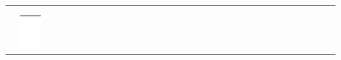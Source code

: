 \documentclass[10pt]{article}
\begin{document}
\begin{center}
\begin{tabular}{|c|c|c|c|c|c|c|c|c|c|c|c|c|c|c|c|c|c|c|c|c|c|c|c|c|c|c|c|c|c|c|c|}
\hline
 &  &  &  &  &  &  &  &  &  &  &  &  &  &  &  &  &  &  &  &  &  &  &  &  &  &  &  &  &  &  &  \\
\hline
 &  &  &  &  &  &  &  &  &  &  &  &  &  &  &  &  &  &  &  &  &  &  &  &  &  &  &  &  &  &  &  \\
\hline
 &  &  &  &  &  &  &  &  &  &  &  &  &  &  &  &  &  &  &  &  &  &  &  &  &  &  &  &  &  &  &  \\
\hline
 & \includegraphics[max width=\textwidth]{2024_11_21_a68a2ba4fc31c5fb438eg-10}
 &  &  &  &  &  &  &  &  &  &  &  &  &  &  &  &  &  &  &  &  &  &  &  &  &  &  &  &  &  &  \\
\hline
\end{tabular}
\end{center}
\end{document}

